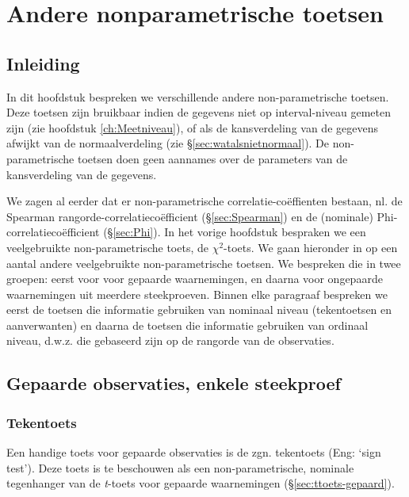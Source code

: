 \documentclass[
]{book}
\begin{document}
\hypertarget{ch:andere-nonpar-toetsen}{%
\chapter{Andere nonparametrische toetsen}\label{ch:andere-nonpar-toetsen}}

\hypertarget{sec:h17inleiding}{%
\section{Inleiding}\label{sec:h17inleiding}}

In dit hoofdstuk bespreken we verschillende andere non-parametrische
toetsen. Deze toetsen zijn bruikbaar indien de gegevens niet op
interval-niveau gemeten zijn (zie hoofdstuk
\ref{ch:Meetniveau}), of als de kansverdeling van de gegevens
afwijkt van de normaalverdeling (zie
§\ref{sec:watalsnietnormaal}). De non-parametrische toetsen doen
geen aannames over de parameters van de kansverdeling van de gegevens.

We zagen al eerder dat er non-parametrische correlatie-coëffienten
bestaan, nl. de Spearman rangorde-correlatiecoëfficient
(§\ref{sec:Spearman}) en de (nominale) Phi-correlatiecoëfficient
(§\ref{sec:Phi}). In
het vorige hoofdstuk bespraken we een veelgebruikte non-parametrische
toets, de \(\chi^2\)-toets. We gaan hieronder in op een aantal andere veelgebruikte
non-parametrische toetsen. We bespreken die in twee groepen: eerst voor
voor gepaarde waarnemingen, en daarna voor ongepaarde waarnemingen uit
meerdere steekproeven. Binnen elke paragraaf bespreken we eerst de
toetsen die informatie gebruiken van nominaal niveau (tekentoetsen en
aanverwanten) en daarna de toetsen die informatie gebruiken van ordinaal
niveau, d.w.z. die gebaseerd zijn op de rangorde van de observaties.

\hypertarget{gepaarde-observaties-enkele-steekproef}{%
\section{Gepaarde observaties, enkele steekproef}\label{gepaarde-observaties-enkele-steekproef}}

\hypertarget{sec:tekentoets}{%
\subsection{Tekentoets}\label{sec:tekentoets}}

Een handige toets voor gepaarde observaties is de zgn. tekentoets (Eng: `sign test').
Deze toets is te beschouwen als een non-parametrische, nominale tegenhanger
van de \emph{t}-toets voor gepaarde waarnemingen
(§\ref{sec:ttoets-gepaard}).
\end{document}
